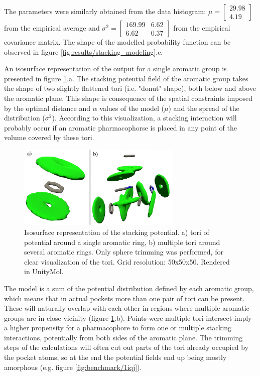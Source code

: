       The parameters were similarly obtained from the data histogram: $\mu = \begin{bmatrix} 29.98 \\ 4.19 \end{bmatrix}$ from the empirical average and $\sigma^2 = \begin{bmatrix} 169.99 & 6.62 \\ 6.62 & 0.37 \end{bmatrix}$ from the empirical covariance matrix. The shape of the modelled probability function can be observed in figure \ref{fig:results/stacking_modeling}.c.

      An isosurface representation of the output for a single aromatic group is presented in figure \ref{fig:results/visualize_stacking}.a. The stacking potential field of the aromatic group takes the shape of two slightly flattened tori (i.e. "donut" shape), both below and above the aromatic plane. This shape is consequence of the spatial constraints imposed by the optimal distance and $\alpha$ values of the model ($\mu$) and the spread of the distribution ($\sigma^2$). According to this visualization, a stacking interaction will probably occur if an aromatic pharmacophorse is placed in any point of the volume covered by these tori.

      \begin{figure}[H]
        \centering
        \includegraphics[width=0.7\textwidth]{figures/results/visualize_stacking.png}
        \caption{\label{fig:results/visualize_stacking} Isosurface representation of the stacking potential. a) tori of potential around a single aromatic ring, b) multiple tori around several aromatic rings. Only sphere trimming was performed, for clear visualization of the tori. Grid resolution: 50x50x50. Rendered in UnityMol.}
      \end{figure}

      The model is a sum of the potential distribution defined by each aromatic group, which means that in actual pockets more than one pair of tori can be present. These will naturally overlap with each other in regions where multiple aromatic groups are in close vicinity (figure \ref{fig:results/visualize_stacking}.b). Points were multiple tori intersect imply a higher propensity for a pharmacophore to form one or multiple stacking interactions, potentially from both sides of the aromatic plane. The trimming steps of the calculations will often cut out parts of the tori already occupied by the pocket atoms, so at the end the potential fields end up being mostly amorphous (e.g. figure \ref{fig:benchmark/1iqj}).

